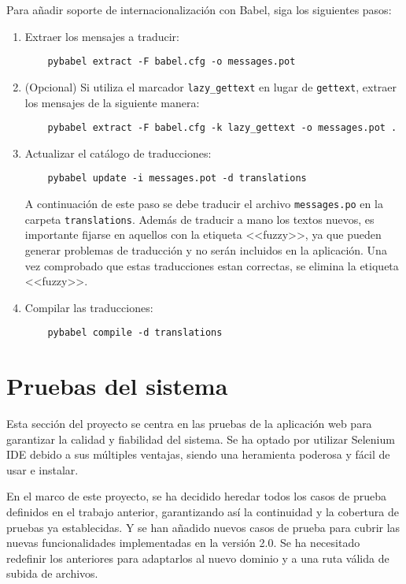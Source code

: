 Para añadir soporte de internacionalización con Babel, siga los siguientes pasos:

\begin{enumerate}
    \item Extraer los mensajes a traducir:
    \begin{verbatim}
    pybabel extract -F babel.cfg -o messages.pot
    \end{verbatim}

    \item (Opcional) Si utiliza el marcador \texttt{lazy\_gettext} en lugar de \texttt{gettext}, extraer los mensajes de la siguiente manera:
    \begin{verbatim}
    pybabel extract -F babel.cfg -k lazy_gettext -o messages.pot .
    \end{verbatim}

    \item Actualizar el catálogo de traducciones:
    \begin{verbatim}
    pybabel update -i messages.pot -d translations
    \end{verbatim}
	A continuación de este paso se debe traducir el archivo \texttt{messages.po} en la carpeta \texttt{translations}. Además de traducir a mano los textos nuevos, es importante fijarse en aquellos con la etiqueta <<fuzzy>>, ya que pueden generar problemas de traducción y no serán incluidos en la aplicación. Una vez comprobado que estas traducciones estan correctas, se elimina la etiqueta <<fuzzy>>.
    \item Compilar las traducciones:
    \begin{verbatim}
    pybabel compile -d translations
    \end{verbatim}
\end{enumerate}

\section{Pruebas del sistema}
Esta sección del proyecto se centra en las pruebas de la aplicación web para garantizar la calidad y fiabilidad del sistema. Se ha optado por utilizar Selenium IDE debido a sus múltiples ventajas, siendo una heramienta poderosa y fácil de usar e instalar.

En el marco de este proyecto, se ha decidido heredar todos los casos de prueba definidos en el trabajo anterior, garantizando así la continuidad y la cobertura de pruebas ya establecidas. Y se han añadido nuevos casos de prueba para cubrir las nuevas funcionalidades implementadas en la versión 2.0. Se ha necesitado redefinir los anteriores para adaptarlos al nuevo dominio y a una ruta válida de subida de archivos.

